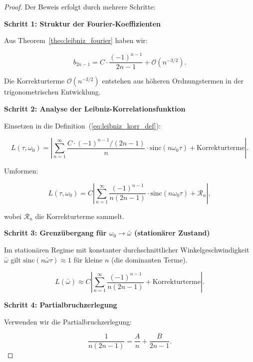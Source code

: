 \documentclass[a4paper,12pt]{article}
\theoremstyle{definition}
\begin{document}
\begin{proof}
  Der Beweis erfolgt durch mehrere Schritte:
  
  \noindent
  \textbf{Schritt 1: Struktur der Fourier-Koeffizienten}
  
  Aus Theorem~\ref{theo:leibniz_fourier} haben wir:
  
  \begin{equation}
    b_{2n-1} = C \cdot \frac{(-1)^{n-1}}{2n-1} + \mathcal{O}(n^{-3/2}).
  \end{equation}
  
  Die Korrekturterme $\mathcal{O}(n^{-3/2})$ entstehen aus höheren Ordnungstermen in der trigonometrischen Entwicklung.
  
  \noindent
  \textbf{Schritt 2: Analyse der Leibniz-Korrelationsfunktion}
  
  Einsetzen in die Definition~(\ref{eq:leibniz_korr_def}):
  
  \begin{equation}
    L(\tau, \omega_0) = \left| \sum_{n=1}^{\infty} \frac{C \cdot (-1)^{n-1}/(2n-1)}{n} \cdot \text{sinc}(n \omega_0 \tau) + \text{Korrekturterme} \right|.
  \end{equation}
  
  Umformen:
  
  \begin{equation}
    L(\tau, \omega_0) = C \left| \sum_{n=1}^{\infty} \frac{(-1)^{n-1}}{n(2n-1)} \cdot \text{sinc}(n \omega_0 \tau) + \mathcal{R}_n \right|,
  \end{equation}
  
  wobei $\mathcal{R}_n$ die Korrekturterme sammelt.
  
  \noindent
  \textbf{Schritt 3: Grenzübergang für $\omega_0 \to \bar{\omega}$ (stationärer Zustand)}
  
  Im stationären Regime mit konstanter durchschnittlicher Winkelgeschwindigkeit $\bar{\omega}$ gilt $\text{sinc}(n \bar{\omega} \tau) \approx 1$ für kleine $n$ (die dominanten Terme).
  
  \begin{equation}
    L(\bar{\omega}) \approx C \left| \sum_{n=1}^{\infty} \frac{(-1)^{n-1}}{n(2n-1)} + \text{Korrekturterme} \right|.
  \end{equation}
  
  \noindent
  \textbf{Schritt 4: Partialbruchzerlegung}
  
  Verwenden wir die Partialbruchzerlegung:
  
  \begin{equation}
    \frac{1}{n(2n-1)} = \frac{A}{n} + \frac{B}{2n-1}.
  \end{equation}
  

\end{proof}
\end{document}

